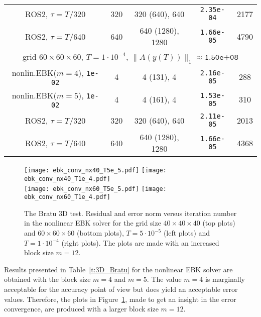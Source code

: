 \documentclass[sn-aps]{sn-jnl}
\theoremstyle{thmstyleone}%
\theoremstyle{thmstyletwo}%
\theoremstyle{thmstylethree}%
\begin{document}
\begin{table}
\begin{tabular}{ccccc}
%
ROS2, $\tau = T/320$              & 320 &  320 (640), 640 & {\tt2.35e-04}  & 2177 \\
%
ROS2, $\tau = T/640$              & 640 & 640 (1280), 1280 & {\tt1.66e-05}  & 4790
\\\hline
\multicolumn{5}{c}{grid $60\times 60\times 60$, $T=1\cdot 10^{-4}$, $\|A(y(T))\|_1\approx\texttt{1.50e+08}$}\\
nonlin.EBK($m=4$), {\tt1e-02} & 4   & 4 (131), 4  & {\tt2.16e-05} & 288 \\
nonlin.EBK($m=5$), {\tt1e-02} & 4   & 4 (161), 4  & {\tt1.53e-05} & 310\\
ROS2, $\tau = T/320$              & 320 &  320 (640), 640 & {\tt2.11e-05}  & 2013 \\
ROS2, $\tau = T/640$              & 640 & 640 (1280), 1280 & {\tt1.66e-05}  & 4368
\\\hline
\end{tabular}
\end{table}
%
%
%

\begin{figure}
\texttt{[image: ebk\_conv\_nx40\_T5e\_5.pdf]}\hfill
\texttt{[image: ebk\_conv\_nx40\_T1e\_4.pdf]}\\[2ex]
\texttt{[image: ebk\_conv\_nx60\_T5e\_5.pdf]}\hfill
\texttt{[image: ebk\_conv\_nx60\_T1e\_4.pdf]}
\caption{The Bratu 3D test. 
Residual and error norm versus iteration number in the nonlinear EBK solver 
for the grid size $40\times 40\times 40$ (top plots) and
$60\times 60\times 60$ (bottom plots),
$T=5\cdot10^{-5}$ (left plots) and
$T=1\cdot10^{-4}$ (right plots).
The plots are made with an increased block size $m=12$.}
\label{f:ebk_Bratu}  
\end{figure}

Results presented in Table~\ref{t:3D_Bratu} for the nonlinear EBK solver 
are obtained with the block size $m=4$ and $m=5$.  The value $m=4$
is marginally acceptable for the accuracy point of view but does
yield an acceptable error values.  Therefore, the plots in 
Figure~\ref{f:ebk_Bratu}, made to get an insight 
in the error convergence, are produced with a larger block
size $m=12$.
\end{document}
